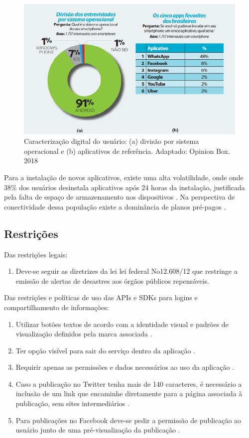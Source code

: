 \documentclass[12pt]{article}
\begin{document}
\begin{figure}[!htb]
\centering
\includegraphics{caract_user}
\caption{Caracterização digital do usuário: (a)  divisão por sistema operacional e (b) aplicativos de referência. Adaptado: Opinion Box. 2018}
\label{Rotulo}
\end{figure}

Para a instalação de novos aplicativos, existe uma alta volatilidade, onde onde 38\% dos usuários desinstala aplicativos após 24 horas da instalação, justificada pela falta de espaço de armazenamento nos dispositivos \cite{Obox}. Na perspectiva de conectividade dessa população existe a dominância de planos pré-pagos \cite{Obox}. 


\subsection{Restrições}

Das restrições legais:

\begin{enumerate}
    \item  Deve-se seguir as diretrizes da lei  lei federal No12.608/12 \cite{leiPNSB} que restringe a emissão de alertas de desastres aos órgãos públicos repensáveis.
\end{enumerate}

Das restrições e políticas de uso das APIs e SDKs para logins e compartilhamento de informações:
\begin{enumerate}
\item Utilizar botões textos de acordo com a identidade visual e padrões de visualização definidos pela marca associada \cite{FACEBOOKDEV} \cite{TWITTERDEV}\cite{GOOGLEDEV}.
\item Ter opção visível para sair do serviço dentro da aplicação \cite{FACEBOOKDEV}\cite{TWITTERDEV}.
\item Requirir apenas as permissões e dados necessários ao uso da aplicação \cite{FACEBOOKDEV}\cite{TWITTERDEV}\cite{GOOGLEDEV}  .
\item Caso a publicação no Twitter tenha mais de 140 caracteres, é necessário a inclusão de um link que encaminhe diretamente para a página associada à publicação, sem sites intermediários \cite{TWITTERDEV}.
\item Para publicações no Facebook deve-se pedir a permissão de publicação ao usuário junto de uma pré-visualização da publicação \cite{FACEBOOKDEV}.
\end{enumerate}
\end{document}
